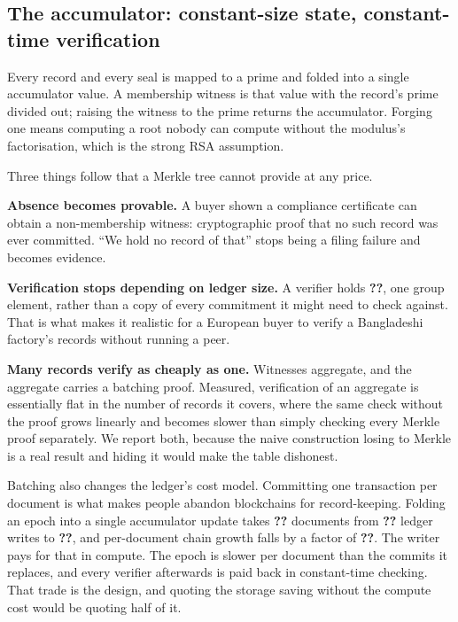 \documentclass[11pt,a4paper]{article}
\providecommand{\num}[1]{\textbf{??}}%
\providecommand{\numunit}[2]{\textbf{??}}%
\begin{document}
\subsection{The accumulator: constant-size state, constant-time verification}
\label{sec:accumulator}

Every record and every seal is mapped to a prime and folded into a single
accumulator value. A membership witness is that value with the record's prime
divided out; raising the witness to the prime returns the accumulator. Forging one
means computing a root nobody can compute without the modulus's factorisation,
which is the strong RSA assumption.

Three things follow that a Merkle tree cannot provide at any price.

\textbf{Absence becomes provable.} A buyer shown a compliance certificate can
obtain a non-membership witness: cryptographic proof that no such record was ever
committed. ``We hold no record of that'' stops being a filing failure and becomes
evidence.

\textbf{Verification stops depending on ledger size.} A verifier holds
\numunit{AccumulatorAccumulatorStateBytes}{bytes}, one group element, rather
than a copy of every commitment it might need to check against. That is what makes
it realistic for a European buyer to verify a Bangladeshi factory's records
without running a peer.

\textbf{Many records verify as cheaply as one.} Witnesses aggregate, and the
aggregate carries a batching proof. Measured, verification of an aggregate is
essentially flat in the number of records it covers, where the same check without
the proof grows linearly and becomes slower than simply checking every Merkle
proof separately. We report both, because the naive construction losing to Merkle
is a real result and hiding it would make the table dishonest.

Batching also changes the ledger's cost model. Committing one transaction per
document is what makes people abandon blockchains for record-keeping. Folding an
epoch into a single accumulator update takes \num{LedgerDocuments} documents from
\num{LedgerCommitTransactions} ledger writes to
\num{LedgerEpochTransactions}, and per-document chain growth falls by a factor of
\num{LedgerStorageReductionFactor}. The writer pays for that in compute. The
epoch is slower per document than the commits it replaces, and every verifier
afterwards is paid back in constant-time checking. That trade is the design, and
quoting the storage saving without the compute cost would be quoting half of it.
\end{document}
